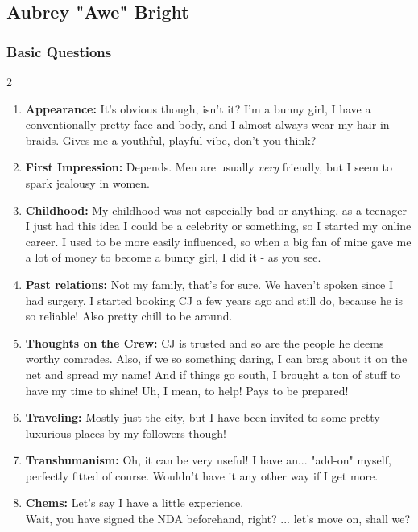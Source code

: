 \def\pfcname{Awe}
\subsection{Aubrey "\pfcname" Bright}
\subsubsection{Basic Questions}
\vspace{8mm}
\begin{multicols}{2}
\begin{enumerate}
	\setlength\itemsep{-8mm}
	\item
	\textbf{Appearance:}
	It's obvious though, isn't it?
	I'm a bunny girl,
	I have a conventionally pretty face and body,
	and I almost always wear my hair in braids.
	Gives me a youthful, playful vibe, don't you think?
	\item
	\textbf{First Impression:}
	Depends.
	Men are usually \emph{very} friendly,
	but I seem to spark jealousy in women.
	\item
	\textbf{Childhood:}
	My childhood was not especially bad or anything,
	as a teenager I just had this idea I could be a celebrity or something,
	so I started my online career.
	I used to be more easily influenced,
	so when a big fan of mine gave me a lot of money
	to become a bunny girl, I did it - as you see.
	\item
	\textbf{Past relations:}
	Not my family, that's for sure.
 	We haven't spoken since I had surgery.
	I started booking CJ a few years ago and still do,
	because he is so reliable!
	Also pretty chill to be around.
	\item
	\textbf{Thoughts on the Crew:}
	CJ is trusted and so are the people he deems worthy comrades.
	Also, if we so something daring,
	I can brag about it on the net and spread my name!
	And if things go south, I brought a ton of stuff to have my time to shine!
	Uh, I mean, to help!
	Pays to be prepared!
	\item
	\textbf{Traveling:}
	Mostly just the city,
	but I have been invited to some pretty luxurious places by my followers though!
	\item
	\textbf{Transhumanism:}
	Oh, it can be very useful!
	I have an... "add-on" myself, perfectly fitted of course.
 	Wouldn't have it any other way if I get more.
	\item
	\textbf{Chems:}
	Let's say I have a little experience.
	\\%
	Wait, you have signed the NDA beforehand, right?
	... let's move on, shall we?

\end{enumerate}
\end{multicols}
